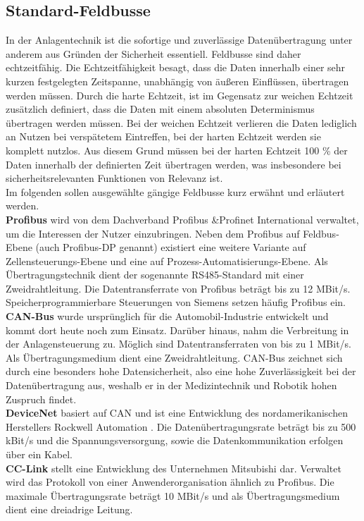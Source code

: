 \documentclass[ a4paper,
                oneside,
                toc=bibliography,
                toc=listof
                ]{scrbook}
\begin{document}
	\subsection{Standard-Feldbusse}
	\label{subsec:StandardFeldbus}
	In der Anlagentechnik ist die sofortige und zuverlässige Datenübertragung unter anderem aus Gründen der Sicherheit essentiell. Feldbusse sind daher echtzeitfähig. Die Echtzeitfähigkeit besagt, dass die Daten innerhalb einer sehr kurzen festgelegten Zeitspanne, unabhängig von äußeren Einflüssen, übertragen werden müssen. Durch die harte Echtzeit, ist im Gegensatz zur weichen Echtzeit zusätzlich definiert, dass die Daten mit einem absoluten Determinismus übertragen werden müssen. Bei der weichen Echtzeit verlieren die Daten lediglich an Nutzen bei verspätetem Eintreffen, bei der harten Echtzeit werden sie komplett nutzlos. Aus diesem Grund müssen bei der harten Echtzeit 100 \% der Daten innerhalb der definierten Zeit übertragen werden, was insbesondere bei sicherheitsrelevanten Funktionen von Relevanz ist. \cite{dopatka2008framework} \cite{Echtzeit} \\
	Im folgenden sollen ausgewählte gängige Feldbusse kurz erwähnt und erläutert werden.\\
	\textbf{Profibus} wird von dem Dachverband \glqq Profibus \&Profinet International\grqq{} verwaltet, um die Interessen der Nutzer einzubringen. Neben dem Profibus auf Feldbus-Ebene (auch Profibus-DP genannt) existiert eine weitere Variante auf Zellensteuerungs-Ebene und eine auf Prozess-Automatisierungs-Ebene. Als Übertragungstechnik dient der sogenannte RS485-Standard mit einer Zweidrahtleitung. Die Datentransferrate von Profibus beträgt bis zu 12 MBit/s. Speicherprogrammierbare Steuerungen von Siemens setzen häufig Profibus ein.  \cite{hering2012elektrotechnik}\\
	\textbf{CAN-Bus} wurde ursprünglich für die Automobil-Industrie entwickelt und kommt dort heute noch zum Einsatz. Darüber hinaus, nahm die Verbreitung in der Anlagensteuerung zu. Möglich sind Datentransferraten von bis zu 1 MBit/s. Als Übertragungsmedium dient eine Zweidrahtleitung. CAN-Bus zeichnet sich durch eine besonders hohe Datensicherheit, also eine hohe Zuverlässigkeit bei der Datenübertragung aus, weshalb er in der Medizintechnik und Robotik hohen Zuspruch findet. \cite{hering2012elektrotechnik}\\
	\textbf{DeviceNet} basiert auf CAN und ist eine Entwicklung des nordamerikanischen Herstellers \glqq Rockwell Automation\grqq{} . Die Datenübertragungsrate beträgt bis zu 500 kBit/s und die Spannungsversorgung, sowie die Datenkommunikation erfolgen über ein Kabel. \cite{hering2012elektrotechnik}\\
	\textbf{CC-Link} stellt eine Entwicklung des Unternehmen \glqq Mitsubishi\grqq{} dar. Verwaltet wird das Protokoll von einer Anwenderorganisation ähnlich zu Profibus. Die maximale Übertragungsrate beträgt 10 MBit/s und als Übertragungsmedium dient eine dreiadrige Leitung. \cite{hering2012elektrotechnik}\\
\end{document}
